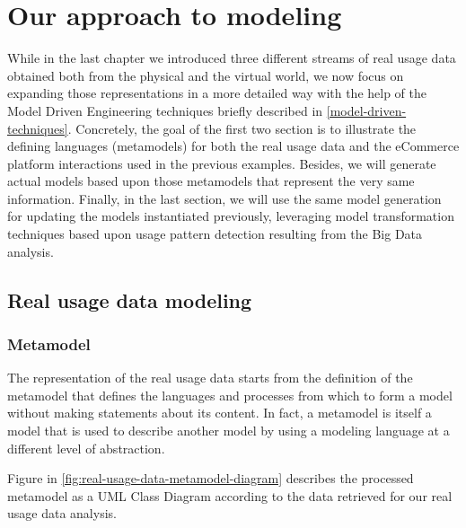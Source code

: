 \chead{}
\chapter{Our approach to modeling}

While in the last chapter we introduced three different streams of real usage data obtained both from the physical and the virtual world, we now focus on expanding those representations in a more detailed way with the help of the Model Driven Engineering techniques briefly described in \ref{model-driven-techniques}. 
Concretely, the goal of the first two section is to illustrate the defining languages (metamodels) for both the real usage data and the eCommerce platform interactions used in the previous examples. Besides, we will generate actual models based upon those metamodels that represent the very same information.
Finally, in the last section, we will use the same model generation for updating the models instantiated previously, leveraging model transformation techniques based upon usage pattern detection resulting from the Big Data analysis.

\section{Real usage data modeling}

\subsection{Metamodel}

The representation of the real usage data starts from the definition of the metamodel that defines the languages and processes from which to form a model without making statements about its content. In fact, a metamodel is itself a model that is used to describe another model by using a modeling language at a different level of abstraction.  

Figure in \ref{fig:real-usage-data-metamodel-diagram} describes the processed metamodel as a UML Class Diagram according to the data retrieved for our real usage data analysis.

